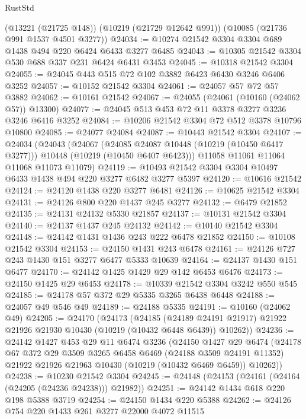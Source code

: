 \begin{lexlean}{RustStd}
\begin{coremodule}
    (@13221 (@21725 @148))
    (@10219 (@21729 @12642 @991))
    (@10085 (@21736 @991 @1537 @4501 @3277))
@24034 := @10274 @21542 @3304 @3304 @689 @1438 @494 @220 @6424 @6433 @3277 @6485
@24043 := @10305 @21542 @3304 @530 @688 @337 @231 @6424 @6431 @3453
@24045 := @10318 @21542 @3304
@24055 := @24045 @443 @515 @72 @102 @3882 @6423 @6430 @3246 @6406 @3252
@24057 := @10152 @21542 @3304
@24061 := @24057 @57 @72 @57 @3882
@24062 := @10161 @21542
@24067 := @24055 (@24061 (@10160 (@24062 @57)) @13300)
@24077 := @24045 @513 @453 @72 @11 @3378 @3277 @3236 @3246 @6416 @3252
@24084 := @10206 @21542 @3304 @72 @512 @3378 @10796 @10800
@24085 := @24077 @24084
@24087 := @10443 @21542 @3304
@24107 := @24034
    (@24043
      (@24067
        (@24085 @24087 @10448 (@10219 (@10450 @6417 @3277)))
        @10448
        (@10219 (@10450 @6407 @6423)))
      @11058
      @11061
      @11064
      @11068
      @11073
      @11079)
@24119 := @10493 @21542 @3304 @3304 @10497 @6433 @1438 @494 @220 @3277 @6482 @3277 @5397
@24120 := @10616 @21542
@24124 := @24120 @1438 @220 @3277 @6481
@24126 := @10625 @21542 @3304
@24131 := @24126 @800 @220 @1437 @245 @3277
@24132 := @6479 @21852
@24135 := @24131 @24132 @5330 @21857
@24137 := @10131 @21542 @3304
@24140 := @24137 @1437 @245 @24132
@24142 := @10140 @21542 @3304
@24148 := @24142 @1431 @1436 @243 @222 @6478 @21852
@24150 := @10108 @21542 @3304
@24153 := @24150 @1431 @243 @6478
@24161 := @24126 @727 @243 @1430 @151 @3277 @6477 @5333 @10639
@24164 := @24137 @1430 @151 @6477
@24170 := @24142 @1425 @1429 @29 @142 @6453 @6476
@24173 := @24150 @1425 @29 @6453
@24178 := @10339 @21542 @3304 @3242 @550 @545
@24185 := @24178 @57 @372 @29 @5335 @3265 @6438 @6448
@24188 := @24057 @49 @546 @49
@24189 := @24188 @5335
@24191 := @10160 (@24062 @49)
@24205 := @24170
    (@24173
      (@24185
        (@24189 @24191 @21917)
        @21922
        @21926
        @21930
        @10430
        (@10219 (@10432 @6448 @6439))
        @10262))
@24236 := @24142
    @1427
    @453
    @29
    @11
    @6474
    @3236
    (@24150
      @1427
      @29
      @6474
      (@24178
        @67
        @372
        @29
        @3509
        @3265
        @6458
        @6469
        (@24188 @3509 @24191 @11352)
        @21922
        @21926
        @21963
        @10430
        (@10219 (@10432 @6469 @6459))
        @10262))
@24238 := @10230 @21542 @3304
@24245 := @24148 (@24153 (@24161 (@24164 (@24205 (@24236 @24238))) @21982))
@24251 := @24142 @1434 @618 @220 @198 @5388 @3719
@24254 := @24150 @1434 @220 @5388
@24262 := @24126 @754 @220 @1433 @261 @3277 @22000 @4072 @11515

\end{coremodule}
\end{lexlean}
